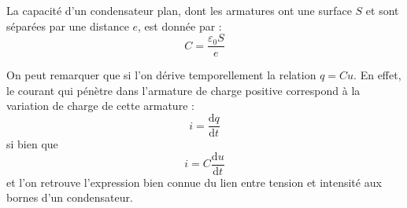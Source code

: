 \documentclass[11pt,fleqn]{book} %
\newcommand{\dd}{\mathrm{d}}
\begin{document}
\begin{proposition}
    La capacité d'un condensateur plan, dont les armatures ont une surface $S$ et sont séparées par une distance $e$, est donnée par :
    \begin{equation}
        C = \frac{\varepsilon_0 S}{e}
    \end{equation}
\end{proposition}

On peut remarquer que si l'on dérive temporellement la relation $q = C u$. En effet, le courant qui pénètre dans l'armature de charge positive correspond à la variation de charge de cette armature :
\begin{equation}
    i = \frac{\dd q}{\dd t}
\end{equation}
si bien que
\begin{equation}
    i = C \frac{\dd u}{\dd t}
\end{equation}
et l'on retrouve l'expression bien connue du lien entre tension et intensité aux bornes d'un condensateur.
\end{document}
